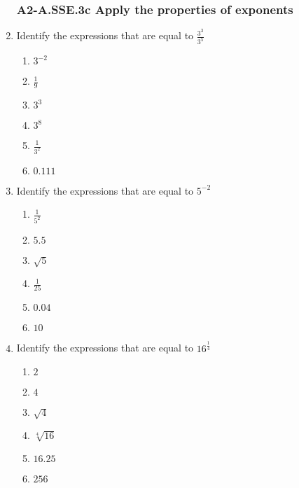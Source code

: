 \documentclass[12pt, twoside]{article}
\begin{document}
\begin{enumerate}[itemsep=0.5cm]
\subsubsection*{A2-A.SSE.3c Apply the properties of exponents}
\item Identify the expressions that are equal to $\displaystyle \frac{3^3}{3^5}$
    \begin{multicols}{2}
    \begin{enumerate}
        \item $3^{-2}$
        \item $\frac{1}{9}$
        \item $3^{3}$
        \item $3^8$
        \item $\displaystyle \frac{1}{3^2}$        
        \item $0.111$
    \end{enumerate}
    \end{multicols}

\item Identify the expressions that are equal to $\displaystyle 5^{-2}$
    \begin{multicols}{2}
    \begin{enumerate}
        \item $\displaystyle \frac{1}{5^2}$
        \item $5.5$
        \item $\sqrt{5}$        
        \item $\displaystyle \frac{1}{25}$
        \item $0.04$        
        \item $10$
    \end{enumerate}
    \end{multicols}

\item Identify the expressions that are equal to $\displaystyle 16^{\frac{1}{4}}$
    \begin{multicols}{2}
    \begin{enumerate}
        \item $2$        
        \item $4$        
        \item $\sqrt{4}$
        \item $\sqrt[4]{16}$
        \item $16.25$
        \item $256$
    \end{enumerate}
    \end{multicols}
        

\end{enumerate}
\end{document}
